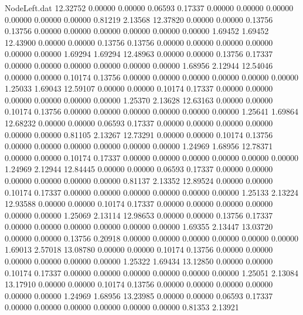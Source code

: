 \begin{filecontents}{NodeLeft.dat}
  12.32752    0.00000    0.00000     0.06593    0.17337    0.00000    0.00000    0.00000    0.00000    0.00000    0.00000    0.81219    2.13568
  12.37820    0.00000    0.00000     0.13756    0.13756    0.00000    0.00000    0.00000    0.00000    0.00000    0.00000    1.69452    1.69452
  12.43900    0.00000    0.00000     0.13756    0.13756    0.00000    0.00000    0.00000    0.00000    0.00000    0.00000    1.69294    1.69294
  12.48963    0.00000    0.00000     0.13756    0.17337    0.00000    0.00000    0.00000    0.00000    0.00000    0.00000    1.68956    2.12944
  12.54046    0.00000    0.00000     0.10174    0.13756    0.00000    0.00000    0.00000    0.00000    0.00000    0.00000    1.25033    1.69043
  12.59107    0.00000    0.00000     0.10174    0.17337    0.00000    0.00000    0.00000    0.00000    0.00000    0.00000    1.25370    2.13628
  12.63163    0.00000    0.00000     0.10174    0.13756    0.00000    0.00000    0.00000    0.00000    0.00000    0.00000    1.25641    1.69864
  12.68232    0.00000    0.00000     0.06593    0.17337    0.00000    0.00000    0.00000    0.00000    0.00000    0.00000    0.81105    2.13267
  12.73291    0.00000    0.00000     0.10174    0.13756    0.00000    0.00000    0.00000    0.00000    0.00000    0.00000    1.24969    1.68956
  12.78371    0.00000    0.00000     0.10174    0.17337    0.00000    0.00000    0.00000    0.00000    0.00000    0.00000    1.24969    2.12944
  12.84445    0.00000    0.00000     0.06593    0.17337    0.00000    0.00000    0.00000    0.00000    0.00000    0.00000    0.81137    2.13352
  12.89524    0.00000    0.00000     0.10174    0.17337    0.00000    0.00000    0.00000    0.00000    0.00000    0.00000    1.25133    2.13224
  12.93588    0.00000    0.00000     0.10174    0.17337    0.00000    0.00000    0.00000    0.00000    0.00000    0.00000    1.25069    2.13114
  12.98653    0.00000    0.00000     0.13756    0.17337    0.00000    0.00000    0.00000    0.00000    0.00000    0.00000    1.69355    2.13447
  13.03720    0.00000    0.00000     0.13756    0.20918    0.00000    0.00000    0.00000    0.00000    0.00000    0.00000    1.69013    2.57018
  13.08780    0.00000    0.00000     0.10174    0.13756    0.00000    0.00000    0.00000    0.00000    0.00000    0.00000    1.25322    1.69434
  13.12850    0.00000    0.00000     0.10174    0.17337    0.00000    0.00000    0.00000    0.00000    0.00000    0.00000    1.25051    2.13084
  13.17910    0.00000    0.00000     0.10174    0.13756    0.00000    0.00000    0.00000    0.00000    0.00000    0.00000    1.24969    1.68956
  13.23985    0.00000    0.00000     0.06593    0.17337    0.00000    0.00000    0.00000    0.00000    0.00000    0.00000    0.81353    2.13921

\end{filecontents}
